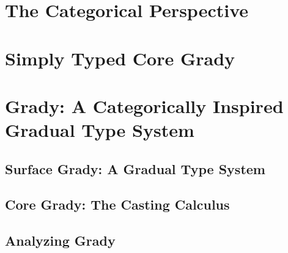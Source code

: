 \documentclass[pacmpl,review,anonymous]{acmart}\settopmatter{printfolios=true}
\begin{document}
\section{The Categorical Perspective}
\label{sec:categorical_perspective}


\section{Simply Typed Core Grady}
\label{sec:sl-grady}


\section{Grady: A Categorically Inspired Gradual Type System}
\label{sec:grady:_a_categorical_inspired_gradual_type_system}

\subsection{Surface Grady: A Gradual Type System}
\label{subsec:surface_grady:_a_gradual_type_system}


\subsection{Core Grady: The Casting Calculus}
\label{subsec:core_grady:_the_casting_calculus}


\subsection{Analyzing Grady}
\label{subsec:results}



\nocite{*}


\appendix



\end{document}
